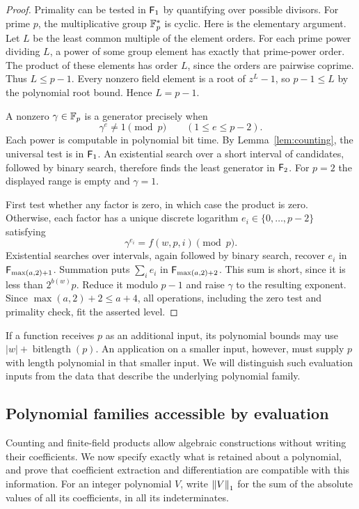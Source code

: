 \begin{proof}
Primality can be tested in $\mathsf F_{1}$ by quantifying over possible
divisors.  For prime $p$, the multiplicative group $\mathbb F_p^*$ is cyclic.
Here is the elementary argument.  Let $L$ be the least common multiple
of the element orders.  For each prime power dividing $L$, a power of
some group element has exactly that prime-power order.  The product of
these elements has order $L$, since the orders are pairwise coprime.
Thus $L\le p-1$.  Every nonzero field element is a root of $z^L-1$, so
$p-1\le L$ by the polynomial root bound.  Hence $L=p-1$.

A nonzero $\gamma\in\mathbb F_p$ is a generator precisely when
\[
 \gamma^e\ne1\pmod p\qquad(1\le e\le p-2).
\]
Each power is computable in polynomial bit time.  By
Lemma~\ref{lem:counting}, the universal test is in $\mathsf F_{1}$.
An existential search over a short interval of candidates, followed by
binary search, therefore finds the least generator in $\mathsf F_{2}$.
For $p=2$ the displayed range is empty and $\gamma=1$.

First test whether any factor is zero, in which case the product is
zero.  Otherwise, each factor has a unique discrete logarithm
$e_i\in\{0,\ldots,p-2\}$ satisfying
\[
 \gamma^{e_i}=f(w,p,i)\pmod p.
\]
Existential searches over intervals, again followed by binary search,
recover $e_i$ in $\mathsf F_{\max(a,2)+1}$.  Summation puts
$\sum_i e_i$ in $\mathsf F_{\max(a,2)+2}$.  This sum is short, since it is
less than $2^{b(w)}p$.  Reduce it modulo $p-1$ and raise $\gamma$ to the
resulting exponent.  Since $\max(a,2)+2\le a+4$, all operations,
including the zero test and primality check, fit the asserted level.
\end{proof}

If a function receives $p$ as an additional input, its polynomial bounds
may use $|w|+\operatorname{bitlength}(p)$.  An application on a smaller
input, however, must supply $p$ with length polynomial in that smaller
input.  We will distinguish such evaluation inputs from the data that
describe the underlying polynomial family.

\subsection{Polynomial families accessible by evaluation}

Counting and finite-field products allow algebraic constructions without
writing their coefficients.  We now specify exactly what is retained about a
polynomial, and prove that coefficient extraction and differentiation
are compatible with this information.  For an integer polynomial $V$,
write $\left\lVert V\right\rVert_1$ for the sum of the absolute values of all its
coefficients, in all its indeterminates.

